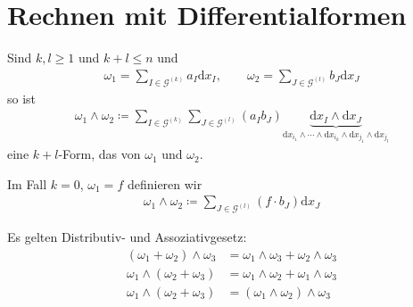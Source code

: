%

\section{Rechnen mit Differentialformen}
\addtocounter{thmn}{1}
\setcounter{theorem}{0}

\begin{theorem}[Multiplikation] \label{thm:8.1}
  \begin{enum-arab}
  \item
    Sind $k,l \ge 1$ und $k+l \le n$ und
    \begin{align*}
      \omega_1 = \sum_{I \in \mathcal{G}^{(k)}} a_I \mathrm{d}x_I
      ,\qquad
      \omega_2 = \sum_{J \in \mathcal{G}^{(l)}} b_J \mathrm{d}x_J
    \end{align*}
    so ist
    \begin{align*}
      \omega_1 \wedge \omega_2 \coloneq \sum_{I \in \mathcal{G}^{(k)}} \sum_{J \in \mathcal{G}^{(l)}} (a_Ib_J) \underbrace{\mathrm{d}x_I \wedge \mathrm{d}x_J}_{\mathrm{d} x_{i_1} \wedge \dotsb \wedge \mathrm{d} x_{i_k} \wedge \mathrm{d} x_{j_1} \wedge \mathrm{d}x_{j_l}}
    \end{align*}
    eine $k+l$-Form, das  von $\omega_1$ und $\omega_2$.
  \item
    Im Fall $k = 0$, $\omega_1 = f$ definieren wir
    \begin{align*}
      \omega_1 \wedge \omega_2 \coloneq \sum_{J\in\mathcal{G}^{(l)}}(f\cdot b_J) \mathrm{d}x_J
    \end{align*}
  \end{enum-arab}
\end{theorem}

\begin{theorem}[Satz] \label{thm:8.2}
  Es gelten Distributiv- und Assoziativgesetz:
  \begin{align*}
    (\omega_1 + \omega_2) \wedge \omega_3 &= \omega_1 \wedge \omega_3 + \omega_2 \wedge \omega_3 \\
    \omega_1 \wedge (\omega_2 + \omega_3) &= \omega_1 \wedge \omega_2 + \omega_1 \wedge \omega_3 \\
    \omega_1 \wedge (\omega_2 + \omega_3) &= (\omega_1 \wedge \omega_2) \wedge \omega_3
  \end{align*}
\end{theorem}

